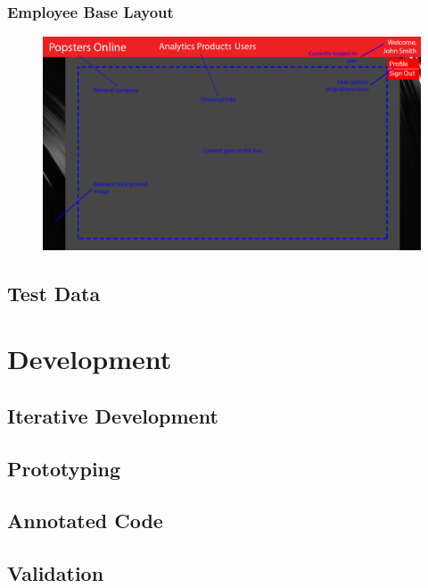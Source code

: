 ﻿\documentclass{article}
\begin{document}
    \paragraph{}

    \newpage
    \subsubsection{Employee Base Layout}
    \begin{figure}[h]
        \includegraphics[width=\textwidth]{employeeBasic.png}
        \centering
    \end{figure}
    \paragraph{}

    \subsection{Test Data}
    
    
    \section{Development}
    \subsection{Iterative Development}
    \subsection{Prototyping}
    \subsection{Annotated Code}
    \subsection{Validation}
\end{document}
